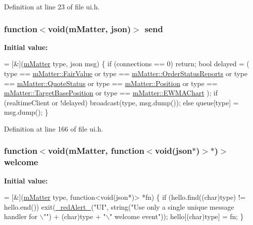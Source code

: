 Definition at line 23 of file ui.\+h.

\subsubsection[{\texorpdfstring{send}{send}}]{\setlength{\rightskip}{0pt plus 5cm}function$<$void({\bf m\+Matter}, json)$>$ send}\hypertarget{class_k_1_1_u_i_ac38fb07fa9906993bdfa70f5005037c2}{}\label{class_k_1_1_u_i_ac38fb07fa9906993bdfa70f5005037c2}
{\bfseries Initial value\+:}
\begin{DoxyCode}
= [&](\hyperlink{namespace_k_a06e0333f0bcd3fc79835735bb9cda73d}{mMatter} type, json msg) \{
        \textcolor{keywordflow}{if} (connections == 0) \textcolor{keywordflow}{return};
        \textcolor{keywordtype}{bool} delayed = (
          type == \hyperlink{namespace_k_a06e0333f0bcd3fc79835735bb9cda73da95c17992a2bcf98203f6a1048774b1f7}{mMatter::FairValue}
          or type == \hyperlink{namespace_k_a06e0333f0bcd3fc79835735bb9cda73daef06507b3899c1e8b810bb8cbeba2b76}{mMatter::OrderStatusReports}
          or type == \hyperlink{namespace_k_a06e0333f0bcd3fc79835735bb9cda73da87c2649b2d5af994788d90af72bc3a9c}{mMatter::QuoteStatus}
          or type == \hyperlink{namespace_k_a06e0333f0bcd3fc79835735bb9cda73da52f5e0bc3859bc5f5e25130b6c7e8881}{mMatter::Position}
          or type == \hyperlink{namespace_k_a06e0333f0bcd3fc79835735bb9cda73dabe5c6be5c4decaf0b568f57bde929b6e}{mMatter::TargetBasePosition}
          or type == \hyperlink{namespace_k_a06e0333f0bcd3fc79835735bb9cda73dac68b9ff55f400f5dd9adcd7a3f5372e4}{mMatter::EWMAChart}
        );
        \textcolor{keywordflow}{if} (realtimeClient or !delayed)
          broadcast(type, msg.dump());
        \textcolor{keywordflow}{else} queue[type] = msg.dump();
      \}
\end{DoxyCode}


Definition at line 166 of file ui.\+h.

\subsubsection[{\texorpdfstring{welcome}{welcome}}]{\setlength{\rightskip}{0pt plus 5cm}function$<$void({\bf m\+Matter}, function$<$void(json$\ast$)$>$$\ast$)$>$ welcome}\hypertarget{class_k_1_1_u_i_aee907877a47fa78974d6b9a2ed1d1fad}{}\label{class_k_1_1_u_i_aee907877a47fa78974d6b9a2ed1d1fad}
{\bfseries Initial value\+:}
\begin{DoxyCode}
= [&](\hyperlink{namespace_k_a06e0333f0bcd3fc79835735bb9cda73d}{mMatter} type, function<void(json*)> *fn) \{
        \textcolor{keywordflow}{if} (hello.find((\textcolor{keywordtype}{char})type) != hello.end())
          exit(\hyperlink{sh_8h_a7a276367773516f9f6e660c3f4635beb}{\_redAlert\_}(\textcolor{stringliteral}{"UI"}, \textcolor{keywordtype}{string}(\textcolor{stringliteral}{"Use only a single unique message handler for \(\backslash\)""})
            + (\textcolor{keywordtype}{char})type + \textcolor{stringliteral}{"\(\backslash\)" welcome event"}));
        hello[(char)type] = fn;
      \}
\end{DoxyCode}


